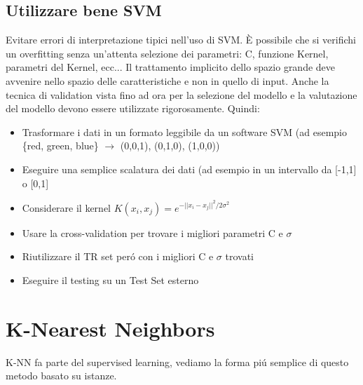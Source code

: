 \documentclass{article}
\begin{document}
\subsection{Utilizzare bene SVM}
Evitare errori di interpretazione tipici nell'uso di SVM. È possibile che si verifichi un overfitting senza un'attenta selezione dei parametri: C, funzione Kernel, parametri del Kernel, ecc... Il trattamento implicito dello spazio grande deve avvenire nello spazio delle caratteristiche e non in quello di input. Anche la tecnica di validation vista fino ad ora per la selezione del modello e la valutazione del modello devono essere utilizzate rigorosamente.\clearpage
Quindi:
\begin{itemize}
    \item Trasformare i dati in un formato leggibile da un software SVM (ad esempio \{red, green, blue\} $\rightarrow$ (0,0,1), (0,1,0), (1,0,0))
    \item Eseguire una semplice scalatura dei dati (ad esempio in un intervallo da [-1,1] o [0,1]
    \item Considerare il kernel $K(x_i,x_j)=e^{-||x_i-x_j||^2/2\sigma^2}$
    \item Usare la cross-validation per trovare i migliori parametri C e $\sigma$
    \item Riutilizzare il TR set peró con i migliori C e $\sigma$ trovati
    \item Eseguire il testing su un Test Set esterno
\end{itemize}

\section{K-Nearest Neighbors}
K-NN fa parte del supervised learning, vediamo la forma piú semplice di questo metodo basato su istanze.
\end{document}
